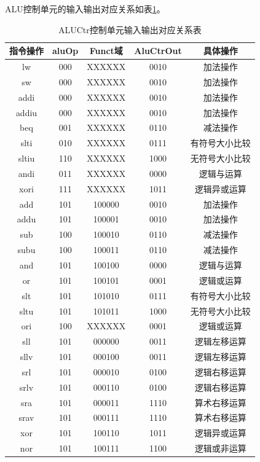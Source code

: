 ALU控制单元的输入输出对应关系如表\ref{6}。

\begin{table}[H]
    \centering
    \begin{tabular}{c|c|c|c|c}
    \hline
        指令操作 & aluOp & Funct域 & AluCtrOut & 具体操作  \\
        \hline
        lw & 000 & XXXXXX & 0010 & 加法操作 \\
        sw & 000 & XXXXXX & 0010 & 加法操作 \\
        addi & 000 & XXXXXX & 0010 & 加法操作 \\
        addiu & 000 & XXXXXX & 0010 & 加法操作 \\
        beq & 001 & XXXXXX & 0110 & 减法操作 \\
        slti & 010 & XXXXXX & 0111 & 有符号大小比较 \\
        sltiu & 110 & XXXXXX & 1000 & 无符号大小比较 \\
        andi & 011 & XXXXXX & 0000 & 逻辑与运算 \\
        xori & 111 & XXXXXX & 1011 & 逻辑异或运算 \\
        add &101 & 100000 & 0010 & 加法操作 \\
        addu & 101 & 100001 & 0010 & 加法操作 \\
        sub & 100 & 100010 & 0110 & 减法操作 \\
        subu & 100 & 100011 & 0110 & 减法操作 \\
        and & 101 & 100100 & 0000 & 逻辑与运算 \\
        or & 101 & 100101 & 0001 & 逻辑或运算 \\
        slt &101 & 101010 & 0111 & 有符号大小比较 \\
        sltu & 101 & 101011 & 1000 & 无符号大小比较 \\
        ori  & 100 & XXXXXX & 0001 & 逻辑或运算\\
        sll & 101 & 000000  & 0011 & 逻辑左移运算 \\
        sllv & 101& 000100 & 0011 & 逻辑左移运算 \\
        srl  & 101 & 000010& 0100 & 逻辑右移运算\\
        srlv & 101 & 000110 & 0100 & 逻辑右移运算 \\
        sra & 101 & 000011 & 1110 & 算术右移运算 \\
        srav & 101 & 000111 & 1110 & 算术右移运算 \\
        xor & 101 & 100110 & 1011 & 逻辑异或运算 \\
        nor & 101 & 100111 & 1100 & 逻辑或非运算 \\
        \hline   
    \end{tabular}
    \caption{ALUCtr控制单元输入输出对应关系表}
    \label{6}
\end{table}

